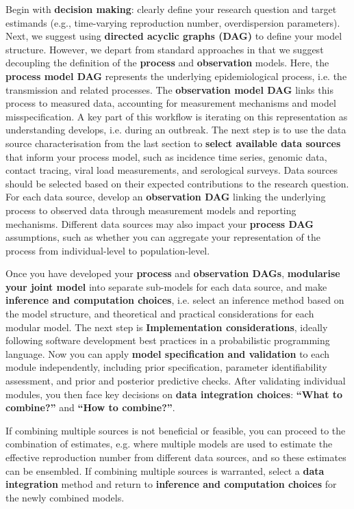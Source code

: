 \documentclass{article}
\begin{document}
Begin with \textbf{decision making}: clearly define your research question and target estimands (e.g., time-varying reproduction number, overdispersion parameters).
Next, we suggest using \textbf{directed acyclic graphs (DAG)}  to define your model structure. However, we depart from standard approaches in that we suggest decoupling the definition of the \textbf{process} and \textbf{observation} models.
Here, the \textbf{process model DAG} represents the underlying epidemiological process, i.e. the transmission and related processes.
The \textbf{observation model DAG} links this process to measured data, accounting for measurement mechanisms and model misspecification.
A key part of this workflow is iterating on this representation as understanding develops, i.e. during an outbreak.
The next step is to use the data source characterisation from the last section to \textbf{select available data sources} that inform your process model, such as incidence time series, genomic data, contact tracing, viral load measurements, and serological surveys.
Data sources should be selected based on their expected contributions to the research question.
For each data source, develop an \textbf{observation DAG} linking the underlying process to observed data through measurement models and reporting mechanisms.
Different data sources may also impact your \textbf{process DAG} assumptions, such as whether you can aggregate your representation of the process from individual-level to population-level.

Once you have developed your \textbf{process} and \textbf{observation DAGs}, \textbf{modularise your joint model} into separate sub-models for each data source, and make \textbf{inference and computation choices}, i.e. select an inference method based on the model structure, and theoretical and practical considerations for each modular model.
The next step is \textbf{Implementation considerations}, ideally following software development best practices in a probabilistic programming language.
Now you can apply \textbf{model specification and validation} to each module independently, including prior specification, parameter identifiability assessment, and prior and posterior predictive checks.
After validating individual modules, you then face key decisions on \textbf{data integration choices}: \textbf{``What to combine?''} and \textbf{``How to combine?''}.

If combining multiple sources is not beneficial or feasible, you can proceed to the combination of estimates, e.g. where multiple models are used to estimate the effective reproduction number from different data sources, and so these estimates can be ensembled.
If combining multiple sources is warranted, select a \textbf{data integration} method and return to \textbf{inference and computation choices} for the newly combined models.
\end{document}
